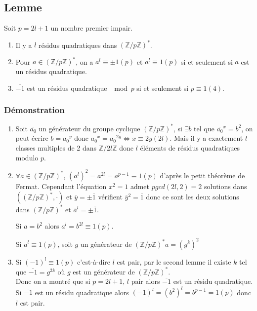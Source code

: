 \documentclass[a4paper,10pt]{book} %
\newcommand{\Z}{\mathbb{Z}}
\begin{document}
\subsection{Lemme}
Soit $p=2l+1$ un nombre premier impair.
\begin{enumerate}
\item Il y a $l$ résidus quadratiques dans $(\Z/p\Z)^*$.
\item Pour $a\in (\Z/p\Z)^*$, on a $a^l\equiv \pm 1(p)$ et $a^l\equiv 1(p)$ si et seulement si $a$ est un résidus quadratique.
\item $\overline{-1}$ est un résidus quadratique $\mod p$ si et seulement si $p\equiv 1(4)$.
\end{enumerate}

\subsubsection{Démonstration}
\begin{enumerate}
\item Soit $\overline{a_0}$ un générateur du groupe cyclique $(\Z/p\Z)^*$, si $\exists b$ tel que $\overline{a_0}^x=b^2$, on peut écrire $b=\overline{a_0}^y$ donc $\overline{a_0}^x=\overline{a_0}^{2y}\Leftrightarrow x\equiv2y(2l)$. Mais il y a exactement $l$ classes multiples de 2 dans $\Z/2l\Z$ donc $l$ éléments de résidus quadratiques modulo $p$.

\item $\forall a \in (\Z/p\Z)^*$, $(a^l)^2=a^{2l}=a^{p-1}\equiv 1(p)$ d'après le petit théorème de Fermat.
Cependant l'équation $x^2=1$ admet $pgcd(2l,2)=2$ solutions dans $((\Z/p\Z)^*,\cdot)$ et $\overline{y}=\pm\overline{1}$ vérifient $\overline{y}^2=\overline{1}$ donc ce sont les deux solutions dans $(\Z/p\Z)^*$ et $\overline{a}^l=\pm\overline{1}$.

Si $a=b^2$ alors $a^l=b^{2l}\equiv 1(p)$.

Si $a^l\equiv 1(p)$, soit $g$ un générateur de $(\Z/p\Z)^*a=(g^k)^2$

\item Si $(-1)^l\equiv 1(p)$ c'est-à-dire $l$ est pair, par le second lemme il existe $k$ tel que $\overline{-1}=g^{2k}$ où $g$ est un générateur de $(\Z/p\Z)^*$.\\

Donc on a montré que si $p=2l+1$, $l$ pair alors $\overline{-1}$ est un résidu quadratique.
Si $\overline{-1}$ est un résidu quadratique alors $(-1)^l=(b^2)^l=b^{p-1}=1(p)$ donc $l$ est pair.
\end{enumerate}
\end{document}
